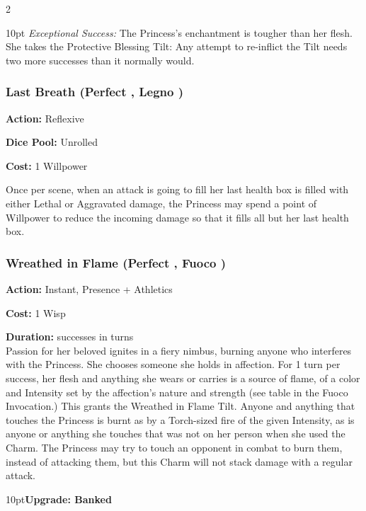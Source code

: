 \begin{multicols}{2}
\begin{myindentpar}{10pt}
\emph{Exceptional Success:} The Princess's enchantment is tougher than her flesh. She takes the Protective Blessing Tilt: Any attempt to re-inflict the Tilt needs two more successes than it normally would.\end{myindentpar}

\subsubsection*{Last Breath (Perfect \textbullet\textbullet, Legno \textbullet\textbullet)}

\noindent \textbf{Action:} Reflexive

\noindent \textbf{Dice Pool:} Unrolled

\noindent \textbf{Cost:} 1 Willpower 

Once per scene, when an attack is going to fill her last health box is filled with either Lethal or Aggravated damage, the Princess may spend a point of Willpower to reduce the incoming damage so that it fills all but her last health box. 

\subsubsection*{Wreathed in Flame (Perfect \textbullet\textbullet, Fuoco \textbullet)}

\noindent \textbf{Action:} Instant, Presence + Athletics

\noindent \textbf{Cost:} 1 Wisp

\noindent \textbf{Duration:} successes in turns \\

\noindent Passion for her beloved ignites in a fiery nimbus, burning anyone who interferes with the Princess. She chooses someone she holds in affection. For 1 turn per success, her flesh and anything she wears or carries is a source of flame, of a color and Intensity set by the affection's nature and strength (see table in the Fuoco Invocation.) This grants the Wreathed in Flame Tilt.  Anyone and anything that touches the Princess is burnt as by a Torch-sized fire of the given Intensity, as is anyone or anything she touches that was not on her person when she used the Charm. The Princess may try to touch an opponent in combat to burn them, instead of attacking them, but this Charm will not stack damage with a regular attack. 

\begin{myindentpar}{10pt}\textbf{Upgrade: Banked}


\end{myindentpar}
\end{multicols}
